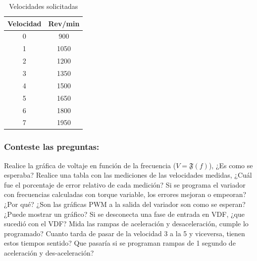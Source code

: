 \begin{table}[H]
	\centering  
	\caption{Velocidades solicitadas}
	\label{Tab:velocidades}
	\begin{tabular}{|c|c|}
		\hline 
		Velocidad	&	Rev/min	\\	\hline 
		
		0	&	900	  	   	 \\ 
		1	&	1050	  	   	 \\ 
		2	&	1200	  	   	 \\ 
		3	&	1350	  	   	 \\ 
		4	&	1500	  	   	 \\ 
		5	&	1650	    	 \\ 
		6	&	1800        	 \\ 
		7	&	1950     	   	 \\ 
		\hline 
	\end{tabular} 
\end{table}
 

 
\subsubsection{Conteste las preguntas:}

Realice la gráfica de voltaje en función de la frecuencia ($V=\mathfrak{F}(f)$), ¿Es como se esperaba?
Realice una tabla con las mediciones de las velocidades medidas, ¿Cuál fue el porcentaje de error relativo de cada medición?
Si se programa el variador con frecuencias calculadas con torque variable, los errores mejoran o empeoran? ¿Por qué?
¿Son las gráficas PWM a la salida del variador son como se esperan? ¿Puede mostrar un gráfico? Si se desconecta una fase de entrada en VDF, ¿que sucedió con el VDF? Mida las rampas de aceleración y desaceleración, cumple lo programado? Cuanto tarda de pasar de la velocidad 3 a la 5 y viceversa, tienen estos tiempos sentido? Que pasaría si se programan rampas de 1 segundo de aceleración y des-aceleración?
 

